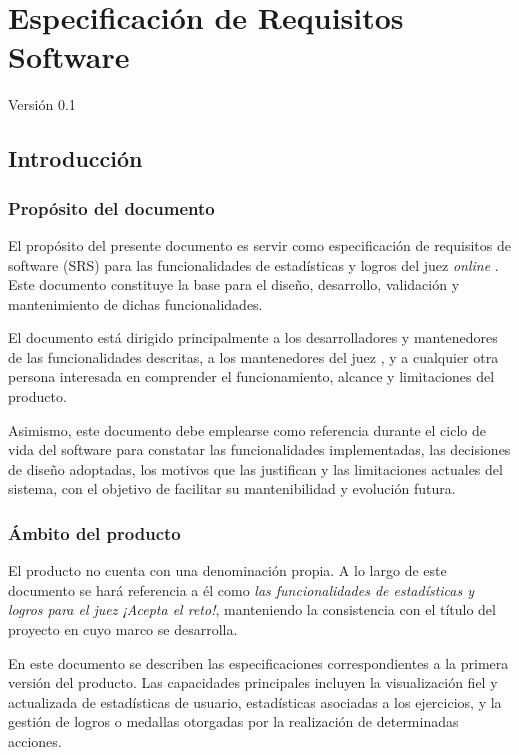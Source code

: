 \chapter{Especificación de Requisitos Software}
\label{cap:SRS}

Versión 0.1\\

\section{Introducción}

\subsection{Propósito del documento}

El propósito del presente documento es servir como especificación de requisitos de software (SRS) para las funcionalidades de estadísticas y logros del juez \textit{online} \aer. Este documento constituye la base para el diseño, desarrollo, validación y mantenimiento de dichas funcionalidades.

El documento está dirigido principalmente a los desarrolladores y mantenedores de las funcionalidades descritas, a los mantenedores del juez \aer, y a cualquier otra persona interesada en comprender el funcionamiento, alcance y limitaciones del producto.

Asimismo, este documento debe emplearse como referencia durante el ciclo de vida del software para constatar las funcionalidades implementadas, las decisiones de diseño adoptadas, los motivos que las justifican y las limitaciones actuales del sistema, con el objetivo de facilitar su mantenibilidad y evolución futura.

\subsection{Ámbito del producto}

El producto no cuenta con una denominación propia. A lo largo de este documento se hará referencia a él como \textit{las funcionalidades de estadísticas y logros para el juez ¡Acepta el reto!}, manteniendo la consistencia con el título del proyecto en cuyo marco se desarrolla.

En este documento se describen las especificaciones correspondientes a la primera versión del producto. Las capacidades principales incluyen la visualización fiel y actualizada de estadísticas de usuario, estadísticas asociadas a los ejercicios, y la gestión de logros o medallas otorgadas por la realización de determinadas acciones.

